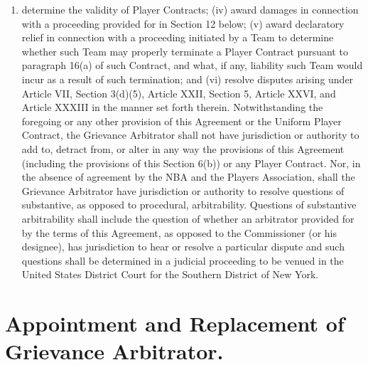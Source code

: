 \documentclass[
]{book}
\providecommand{\tightlist}{%
  \setlength{\itemsep}{0pt}\setlength{\parskip}{0pt}}
\begin{document}
\begin{enumerate}
\def\labelenumi{(\roman{enumi})}
\setcounter{enumi}{2}
\tightlist
\item
  determine the validity of Player Contracts; (iv) award damages in connection with a proceeding provided for in Section 12 below; (v) award declaratory relief in connection with a proceeding initiated by a Team to determine whether such Team may properly terminate a Player Contract pursuant to paragraph 16(a) of such Contract, and what, if any, liability such Team would incur as a result of such termination; and (vi) resolve disputes arising under Article VII, Section 3(d)(5), Article XXII, Section 5, Article XXVI, and Article XXXIII in the manner set forth therein. Notwithstanding the foregoing or any other provision of this Agreement or the Uniform Player Contract, the Grievance Arbitrator shall not have jurisdiction or authority to add to, detract from, or alter in any way the provisions of this Agreement (including the provisions of this Section 6(b)) or any Player Contract. Nor, in the absence of agreement by the NBA and the Players Association, shall the Grievance Arbitrator have jurisdiction or authority to resolve questions of substantive, as opposed to procedural, arbitrability. Questions of substantive arbitrability shall include the question of whether an arbitrator provided for by the terms of this Agreement, as opposed to the Commissioner (or his designee), has jurisdiction to hear or resolve a particular dispute and such questions shall be determined in a judicial proceeding to be venued in the United States District Court for the Southern District of New York.
\end{enumerate}

\hypertarget{appointment-and-replacement-of-grievance-arbitrator.}{%
\section{Appointment and Replacement of Grievance Arbitrator.}\label{appointment-and-replacement-of-grievance-arbitrator.}}
\end{document}
